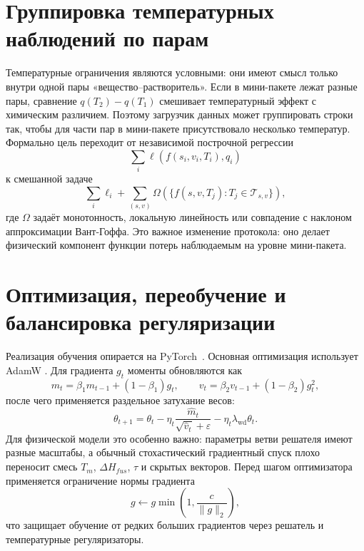\documentclass[11pt]{article}
\theoremstyle{definition}
\begin{document}
\section{Группировка температурных наблюдений по парам}
\label{app:pair-aware-batching}

Температурные ограничения являются условными: они имеют смысл только внутри одной пары «вещество--растворитель». Если в мини-пакете лежат разные пары, сравнение $q(T_2)-q(T_1)$ смешивает температурный эффект с химическим различием. Поэтому загрузчик данных может группировать строки так, чтобы для части пар в мини-пакете присутствовало несколько температур. Формально цель переходит от независимой построчной регрессии
\begin{equation*}
    \sum_i \ell(f(s_i,v_i,T_i),q_i)
\end{equation*}
к смешанной задаче
\begin{equation*}
    \sum_i \ell_i
    +
    \sum_{(s,v)}
    \Omega\left(\{f(s,v,T_j):T_j\in\mathcal T_{s,v}\}\right),
\end{equation*}
где $\Omega$ задаёт монотонность, локальную линейность или совпадение с наклоном аппроксимации Вант-Гоффа. Это важное изменение протокола: оно делает физический компонент функции потерь наблюдаемым на уровне мини-пакета.

\section{Оптимизация, переобучение и балансировка регуляризации}
\label{app:optimization}

Реализация обучения опирается на PyTorch~\cite{paszke2019}. Основная оптимизация использует AdamW \cite{kingma2015,loshchilov2019}. Для градиента $g_t$ моменты обновляются как
\begin{equation*}
    m_t=\beta_1m_{t-1}+(1-\beta_1)g_t,
    \qquad
    v_t=\beta_2v_{t-1}+(1-\beta_2)g_t^2,
\end{equation*}
после чего применяется раздельное затухание весов:
\begin{equation*}
    \theta_{t+1}
    =\theta_t
    -\eta_t\frac{\hat m_t}{\sqrt{\hat v_t}+\varepsilon}
    -\eta_t\lambda_{\mathrm{wd}}\theta_t .
\end{equation*}
Для физической модели это особенно важно: параметры ветви решателя имеют разные масштабы, а обычный стохастический градиентный спуск плохо переносит смесь $T_m$, $\Delta H_{fus}$, $\tau$ и скрытых векторов. Перед шагом оптимизатора применяется ограничение нормы градиента
\begin{equation*}
    g\leftarrow g\min\left(1,\frac{c}{\|g\|_2}\right),
\end{equation*}
что защищает обучение от редких больших градиентов через решатель и температурные регуляризаторы.
\end{document}
